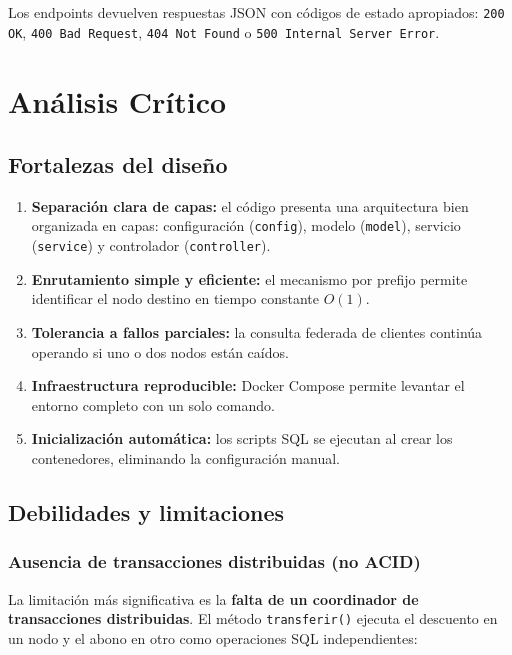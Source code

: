 \documentclass[12pt, a4paper]{article}
\begin{document}
Los endpoints devuelven respuestas JSON con códigos de estado apropiados: \texttt{200 OK}, \texttt{400 Bad Request}, \texttt{404 Not Found} o \texttt{500 Internal Server Error}.

\section{Análisis Crítico}

\subsection{Fortalezas del diseño}
\begin{enumerate}
  \item \textbf{Separación clara de capas:} el código presenta una arquitectura bien organizada en capas: configuración (\texttt{config}), modelo (\texttt{model}), servicio (\texttt{service}) y controlador (\texttt{controller}).
  \item \textbf{Enrutamiento simple y eficiente:} el mecanismo por prefijo permite identificar el nodo destino en tiempo constante $O(1)$.
  \item \textbf{Tolerancia a fallos parciales:} la consulta federada de clientes continúa operando si uno o dos nodos están caídos.
  \item \textbf{Infraestructura reproducible:} Docker Compose permite levantar el entorno completo con un solo comando.
  \item \textbf{Inicialización automática:} los scripts SQL se ejecutan al crear los contenedores, eliminando la configuración manual.
\end{enumerate}

\subsection{Debilidades y limitaciones}

\subsubsection{Ausencia de transacciones distribuidas (no ACID)}
La limitación más significativa es la \textbf{falta de un coordinador de transacciones distribuidas}. El método \texttt{transferir()} ejecuta el descuento en un nodo y el abono en otro como operaciones SQL independientes:
\end{document}
